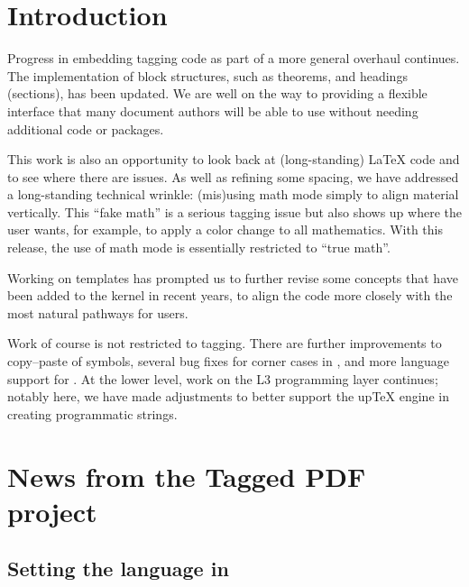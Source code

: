 \documentclass{ltnews}
\begin{document}
\maketitle
{  \spaceskip=3.33pt 
\tableofcontents}



\setlength{}

\section{Introduction}

Progress in embedding tagging code as part of a more general overhaul
continues. The implementation of block structures, such as theorems, and
headings (sections), has been updated. We are well on the way to providing a
flexible interface that many document authors will be able to use without
needing additional code or packages.

This work is also an opportunity to look back at (long-standing) \LaTeX{} code
and to see where there are issues. As well as refining some spacing, we have
addressed a long-standing technical wrinkle: (mis)using math mode simply to align
material vertically. This \enquote{fake math} is a serious tagging issue but also shows
up where the user wants, for example, to apply a color change to all mathematics. With
this release, the use of math mode is essentially restricted to \enquote{true
math}.

Working on templates has prompted us to further revise some concepts that have been
added to the kernel in recent years, to align the code more closely with the
most natural pathways for users.

Work of course is not restricted to tagging. There are further improvements to
copy--paste of symbols, several bug fixes for corner cases in , and
more language support for . At the lower level, work on the L3
programming layer continues; notably here, we have made adjustments to better
support the up\TeX{} engine in creating programmatic strings.


\section{News from the Tagged PDF project}

\subsection{Setting the language in }
\end{document}

